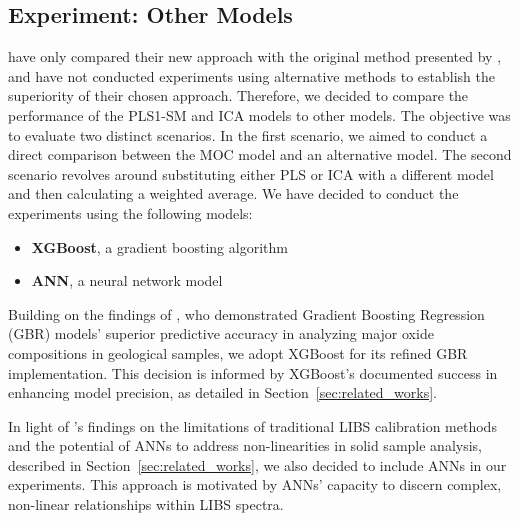 \subsection{Experiment: Other Models}\label{sec:experiment_other_models}
\citet{cleggRecalibrationMarsScience2017} have only compared their new approach with the original method presented by \citet{wiensPreFlight3}, and have not conducted experiments using alternative methods to establish the superiority of their chosen approach.
Therefore, we decided to compare the performance of the PLS1-SM and ICA models to other models.
The objective was to evaluate two distinct scenarios.
In the first scenario, we aimed to conduct a direct comparison between the MOC model and an alternative model. The second scenario revolves around substituting either PLS or ICA with a different model and then calculating a weighted average.
We have decided to conduct the experiments using the following models:

\begin{itemize}
	\item \textbf{XGBoost}, a gradient boosting algorithm \cite{chen_xgboost_2016}
	\item \textbf{ANN}, a neural network model
\end{itemize}

Building on the findings of \citet{andersonPostlandingMajorElement2022}, who demonstrated Gradient Boosting Regression (GBR) models' superior predictive accuracy in analyzing major oxide compositions in geological samples, we adopt XGBoost for its refined GBR implementation.
This decision is informed by XGBoost's documented success in enhancing model precision, as detailed in Section~\ref{sec:related_works}.

In light of \citeauthor{takahashi_quantitative_2017}'s findings on the limitations of traditional LIBS calibration methods and the potential of ANNs to address non-linearities in solid sample analysis, described in Section~\ref{sec:related_works}, we also decided to include ANNs in our experiments.
This approach is motivated by ANNs' capacity to discern complex, non-linear relationships within LIBS spectra.

